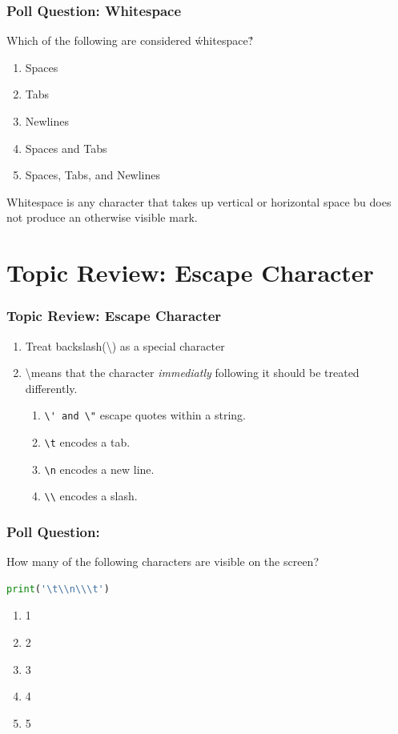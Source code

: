 \documentclass{beamer}
\begin{document}
%
%
%
\begin{frame}[fragile]
  \frametitle{Poll Question: Whitespace}
  Which of the following are considered \'whitespace\'?
  \vfill
  \begin{enumerate}
    \item Spaces
    \item Tabs
    \item Newlines
    \item Spaces and Tabs
    \item Spaces, Tabs, and Newlines
  \end{enumerate}
  \pause
  \vfill
  Whitespace is any character that takes up vertical or horizontal space bu does not produce an otherwise visible mark.
\end{frame}


%
%
%
\section{Topic Review: Escape Character}
\begin{frame}[fragile]
  \frametitle{Topic Review: Escape Character}
  \begin{enumerate}
    \item Treat backslash(\textbackslash) as a special character
    \item \textbackslash means that the character \textit{immediatly} following it should be treated differently.
      \begin{enumerate}
        \item \lstinline{\' and \"} escape quotes within a string.
        \item \lstinline{\t} encodes a tab.
        \item \lstinline{\n} encodes a new line.
        \item \lstinline{\\} encodes a slash.
      \end{enumerate}
  \end{enumerate}
\end{frame}

%
%
%
\begin{frame}[fragile]
  \frametitle{Poll Question: }
  How many of the following characters are visible on the screen?\\
  \begin{lstlisting}[language=Python]
  print('\t\\n\\\t')
  \end{lstlisting}
  \vfill
  \begin{minipage}{.48\textwidth}
    \begin{enumerate}
      \item 1
      \item 2
      \item 3
      \item 4
      \item 5
    \end{enumerate}
  \end{minipage}
  \begin{minipage}{.48\textwidth}
  \end{minipage}
\end{frame}
\end{document}

